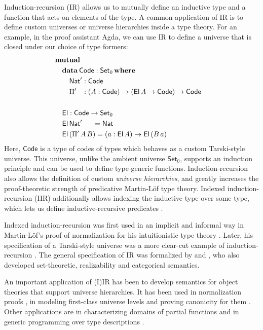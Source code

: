 \documentclass[acmsmall,screen,review]{acmart}
\newcommand{\msf}[1]{{\mathsf{#1}}}
\newcommand{\mbf}[1]{{\mathbf{#1}}}
\newcommand{\data}{\mbf{data}}
\newcommand{\Set}{\msf{Set}}
\newcommand{\where}{\mbf{where}}
\newcommand{\Nat}{\msf{Nat}}
\newcommand{\El}{\msf{El}}
\newcommand{\Code}{\msf{Code}}
\begin{document}
Induction-recursion (IR) allows us to mutually define an inductive type and a function that acts on
elements of the type. A common application of IR is to define custom universes or universe
hierarchies inside a type theory. For an example, in the proof assistant Agda, we can use IR to
define a universe that is closed under our choice of type formers:
\begin{alignat*}{3}
  & \mbf{mutual} \\
  & \quad\data\,\Code : \Set_0\,\where \\
  & \quad\quad \Nat' : \Code\\
  & \quad\quad \Pi' \hspace{0.8em} : (A : \Code) \to (\El\,A \to \Code) \to \Code
  & \\
  & \\
  & \quad\El : \Code \to \Set_0 \\
  & \quad\El\,\Nat'\hspace{1.5em}  = \Nat \\
  & \quad\El\,(\Pi'\,A\,B) = (a : \El\,A) \to \El\,(B\,a)
\end{alignat*}
Here, $\Code$ is a type of codes of types which behaves as a custom Tarski-style universe. This
universe, unlike the ambient universe $\Set_0$, supports an induction principle and can be used to
define type-generic functions. Induction-recursion also allows the definition of custom
\emph{universe hierarchies}, and greatly increases the proof-theoretic strength of predicative
Martin-Löf type theory. Indexed induction-recursion (IIR) additionally allows indexing the inductive
type over some type, which lets us define inductive-recursive predicates
\cite{DBLP:journals/jlp/DybjerS06}.

Indexed induction-recursion was first used in an implicit and informal way in Martin-Löf's proof of
normalization for his intuitionistic type theory \cite{martin1975intuitionistic}. Later, his
specification of a Tarski-style universe was a more clear-cut example of induction-recursion
\cite{martinlof84sambin}. The general specification of IR was formalized by
\citet{DBLP:journals/jsyml/Dybjer00} and
\citet{dybjer99finite,DBLP:journals/jlp/DybjerS06,DBLP:journals/apal/DybjerS03}, who also developed
set-theoretic, realizability and categorical semantics.

An important application of (I)IR has been to develop semantics for object theories that support
universe hierarchies. It has been used in normalization proofs
\cite{DBLP:journals/pacmpl/0001OV18,DBLP:journals/pacmpl/PujetT23,DBLP:journals/pacmpl/AbelDE23}, in
modeling first-class universe levels \cite{first-class-univ} and proving canonicity for them
\cite{DBLP:journals/corr/abs-2502-20485}. Other applications are in characterizing domains of
partial functions \cite{DBLP:conf/tphol/BoveC01} and in generic programming over type descriptions
\cite{DBLP:journals/njc/BenkeDJ03,diehl2017fully}.
\end{document}
